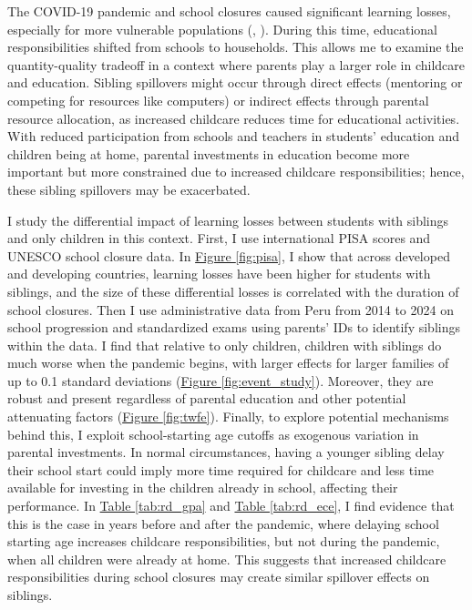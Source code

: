 \documentclass[11pt,a4paper,twoside]{article}
\begin{document}
The COVID-19 pandemic and school closures caused significant learning losses, especially for more vulnerable populations (\cite{haelermans_inequality_2022}, \cite{jakubowski_global_2023}). During this time, educational responsibilities shifted from schools to households. This allows me to examine the quantity-quality tradeoff in a context where parents play a larger role in childcare and education. Sibling spillovers might occur through direct effects (mentoring or competing for resources like computers) or indirect effects through parental resource allocation, as increased childcare reduces time for educational activities. With reduced participation from schools and teachers in students’ education and children being at home, parental investments in education become more important but more constrained due to increased childcare responsibilities; hence, these sibling spillovers may be exacerbated. 

I study the differential impact of learning losses between students with siblings and only children in this context. First, I use international PISA scores and UNESCO school closure data. In \hyperref[fig:pisa]{Figure \ref{fig:pisa}}, I show that across developed and developing countries, learning losses have been higher for students with siblings, and the size of these differential losses is correlated with the duration of school closures. Then I use administrative data from Peru from 2014 to 2024 on school progression and standardized exams using parents' IDs to identify siblings within the data. I find that relative to only children, children with siblings do much worse when the pandemic begins, with larger effects for larger families of up to 0.1 standard deviations (\hyperref[fig:event_study]{Figure \ref{fig:event_study}}). Moreover, they are robust and present regardless of parental education and other potential attenuating factors (\hyperref[fig:twfe]{Figure \ref{fig:twfe}}). Finally, to explore potential mechanisms behind this, I exploit school-starting age cutoffs as exogenous variation in parental investments. In normal circumstances, having a younger sibling delay their school start could imply more time required for childcare and less time available for investing in the children already in school, affecting their performance. In \hyperref[tab:rd_gpa]{Table \ref{tab:rd_gpa}} and \hyperref[tab:rd_ece]{Table \ref{tab:rd_ece}}, I find evidence that this is the case in years before and after the pandemic, where delaying school starting age increases childcare responsibilities, but not during the pandemic, when all children were already at home. This suggests that increased childcare responsibilities during school closures may create similar spillover effects on siblings.
\end{document}
